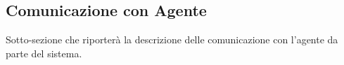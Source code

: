 \subsection{Comunicazione con Agente}

Sotto-sezione che riporterà la descrizione delle comunicazione con l'agente da parte del sistema.
